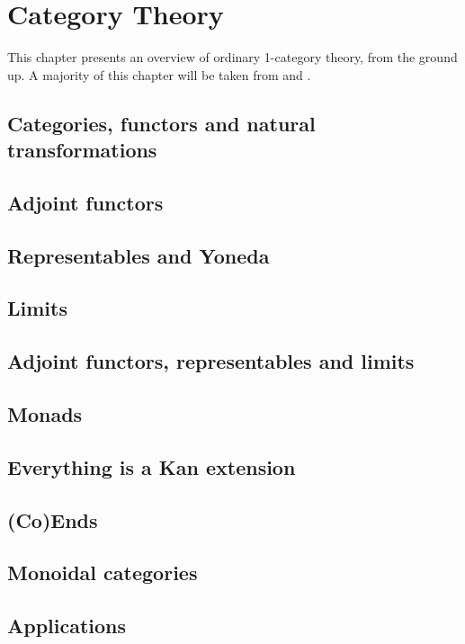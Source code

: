 \chapter{Category Theory}\label{cha:category-theory}
This chapter presents an overview of ordinary 1-category theory, from the ground up. A majority of this chapter will be taken from \cite{Leinster:Basic_Category_Theory} and \cite{riehl2016category}.

\section{Categories, functors and natural transformations}

\section{Adjoint functors}

\section{Representables and Yoneda}

\section{Limits}

\section{Adjoint functors, representables and limits}

\section{Monads}

\section{Everything is a Kan extension}

\section{(Co)Ends}

\section{Monoidal categories}

\section{Applications}

